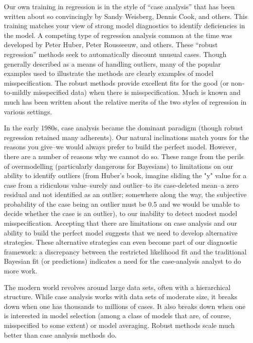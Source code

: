 \documentclass{article}
\newcommand{\response}[1]{{\color{blue}#1}}
\begin{document}
\response{Our own training in regression is in the style of ``case analysis'' that has been written about so convincingly by Sandy Weisberg, Dennis Cook, and others.  This training matches your view of strong model diagnostics to identify deficiencies in the model.  A competing type of regression analysis common at the time was developed by Peter Huber, Peter Rousseeuw, and others.  These ``robust regression'' methods seek to automatically discount unusual cases.  Though generally described as a means of handling outliers, many of the popular examples used to illustrate the methods are clearly examples of model misspecification.  The robust methods provide excellent fits for the good (or non-to-mildly misspecified data) when there is misspecification.  Much is known and much has been written about the relative merits of the two styles of regression in various settings.  

In the early 1980s, case analysis became the dominant paradigm (though robust regression retained many adherents).  Our natural inclinations match yours for the reasons you give--we would always prefer to build the perfect model.  However, there are a number of reasons why we cannot do so.  These range from the perils of overmodelling (particularly dangerous for Bayesians) to limitations on our ability to identify outliers (from Huber's book, imagine sliding the "y" value for a case from a ridiculous value--surely and outlier--to its case-deleted mean--a zero residual and not identified as an outlier; somewhere along the way, the subjective probability of the case being an outlier must be 0.5 and we would be unable to decide whether the case is an outlier), to our inability to detect modest model misspecification.  Accepting that there are limitations on case analysis and our ability to build the perfect model suggests that we need to develop alternative strategies.  These alternative strategies can even become part of our diagnostic framework:  a discrepancy between the restricted likelihood fit and the traditional Bayesian fit (or predictions) indicates a need for the case-analysis analyst to do more work.  

The modern world revolves around large data sets, often with a hierarchical structure.  While case analysis works with data sets of moderate size, it breaks down when one has thousands to millions of cases.  It also breaks down when one is interested in model selection (among a class of models that are, of course, misspecified to some extent) or model averaging.  Robust methods scale much better than case analysis methods do.  

}
\end{document}
